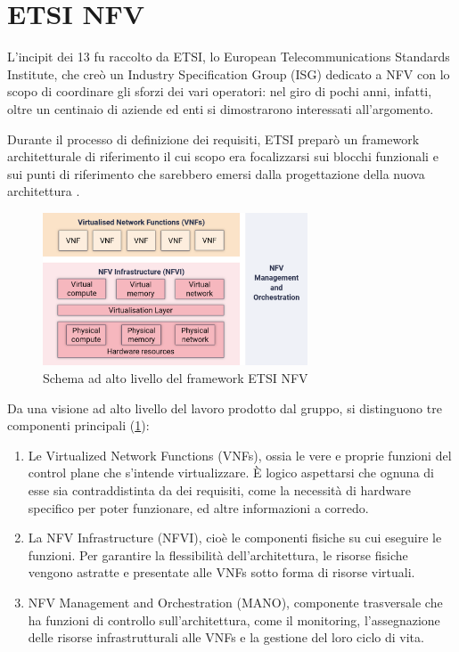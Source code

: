 \section{ETSI NFV}

L'incipit dei 13 fu raccolto da ETSI, lo European Telecommunications Standards Institute, che creò un Industry Specification Group (ISG) dedicato a NFV con lo scopo di coordinare gli sforzi dei vari operatori: nel giro di pochi anni, infatti, oltre un centinaio di aziende ed enti si dimostrarono interessati all'argomento.

Durante il processo di definizione dei requisiti, ETSI preparò un framework architetturale di riferimento il cui scopo era focalizzarsi sui blocchi funzionali e sui punti di riferimento che sarebbero emersi dalla progettazione della nuova architettura \cite{estinfv002}.

\begin{figure}[htb]
    \includegraphics[width=0.7\textwidth]{graphics/high-level_etsi_framework.png}
    \caption{Schema ad alto livello del framework ETSI NFV}
    \label{fig:esti-nfv-high-level}
\end{figure}

Da una visione ad alto livello del lavoro prodotto dal gruppo, si distinguono tre componenti principali (\cref{fig:esti-nfv-high-level}):

\begin{enumerate}
    \item Le Virtualized Network Functions (VNFs), ossia le vere e proprie funzioni del control plane che s'intende virtualizzare. È logico aspettarsi che ognuna di esse sia contraddistinta da dei requisiti, come la necessità di hardware specifico per poter funzionare, ed altre informazioni a corredo.
    \item La NFV Infrastructure (NFVI), cioè le componenti fisiche su cui eseguire le funzioni. Per garantire la flessibilità dell'architettura, le risorse fisiche vengono astratte e presentate alle VNFs sotto forma di risorse virtuali.
    \item NFV Management and Orchestration (MANO), componente trasversale che ha funzioni di controllo sull'architettura, come il monitoring, l'assegnazione delle risorse infrastrutturali alle VNFs e la gestione del loro ciclo di vita.
\end{enumerate}

